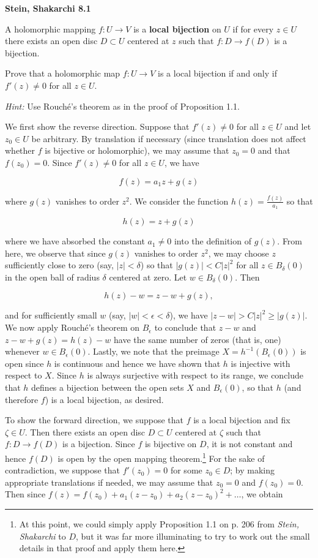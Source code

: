 \textbf{Stein, Shakarchi 8.1}

A holomorphic mapping $f: U \to V$ is a \textbf{local bijection} on $U$ if for every $z \in U$ there exists an open disc
$D \subset U$ centered at $z$ such that $f: D \to f(D)$ is a bijection.

Prove that a holomorphic map $f : U \to V$ is a local bijection if and only if $f'(z) \neq 0$ for all $z \in U$.

\textit{Hint:} Use Rouché's theorem as in the proof of Proposition 1.1.

\begin{solution}
  We first show the reverse direction. Suppose that $f'(z) \neq 0$ for all $z \in U$ and let $z_0 \in U$ be arbitrary. 
  By translation if necessary (since translation does not affect whether $f$ is bijective or holomorphic), we may assume 
  that $z_0 = 0$ and that $f(z_0) = 0$. Since $f'(z) \neq 0$ for all $z \in U$, we have

  $$
  f(z) = a_1 z + g(z)
  $$

  where $g(z)$ vanishes to order $z^2$. We consider the function $h(z) = \frac{f(z)}{a_1}$ so that

  $$
  h(z) = z + g(z)
  $$

  where we have absorbed the constant $a_1 \neq 0$ into the definition of $g(z)$. From here, we observe that since
  $g(z)$ vanishes to order $z^2$, we may choose $z$ sufficiently close to zero (say, $|z| < \delta$) so that 
  $|g(z)| < C |z|^2$ for all $z \in B_{\delta}(0)$ in the open ball of radius $\delta$ centered at zero. Let 
  $w \in B_{\delta}(0)$. Then

  $$
  h(z) - w  = z - w + g(z),
  $$

  and for sufficiently small $w$ (say, $|w| < \epsilon < \delta$), we have $|z - w| > C|z|^2 \ge |g(z)|$. We now apply 
  Rouché's theorem on $B_{\epsilon}$ to conclude that $z - w$ and $z - w + g(z) = h(z) - w$ have the same number of 
  zeros (that is, one) whenever $w \in B_{\epsilon}(0)$. Lastly, we note that the preimage 
  $X = h^{-1}\left(B_{\epsilon}(0) \right)$ is open since $h$ is continuous and hence we have shown that $h$ is 
  injective with respect to $X$. Since $h$ is always surjective with respect to its range, we conclude that $h$ defines 
  a bijection between the open sets $X$ and $B_{\epsilon}(0)$, so that $h$ (and therefore $f$) is a local bijection, as 
  desired.


  To show the forward direction, we suppose that $f$ is a local bijection and fix $\zeta \in U$. Then there exists an open disc $D \subset U$ 
  centered at $\zeta$ such that $f: D \to f(D)$ is a bijection. Since $f$ is bijective on $D$, it is not constant and 
  hence $f(D)$ is open by the open mapping theorem.\footnote{
    At this point, we could simply apply Proposition 1.1 on p. 206 from \textit{Stein, Shakarchi} to $D$, but it was far 
    more illuminating to try to work out the small details in that proof and apply them here.
  }
  For the sake of contradiction, we suppose that $f'(z_0) = 0$ for some $z_0 \in D$; by making appropriate translations
  if needed, we may assume that $z_0 = 0$ and $f(z_0) = 0$. Then since 
  $f(z) = f(z_0) + a_1(z - z_0) + a_2(z - z_0)^2 + \hdots$, we obtain
  

\end{solution}
